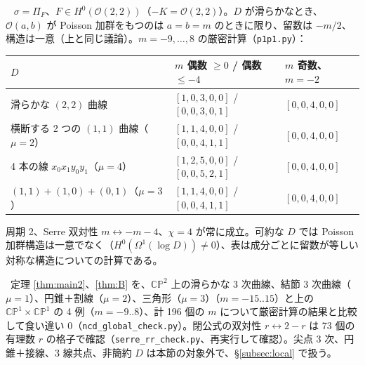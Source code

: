 \begin{ex}\tP\ \tV\label{ex:p1p1}
$\sigma=\Pi_F$、$F\in H^0(\mathcal O(2,2))$（$-K=\mathcal O(2,2)$）。$D$ が滑らかなとき、$\mathcal O(a,b)$ が Poisson 加群をもつのは $a=b=m$ のときに限り、留数は $-m/2$、構造は一意（上と同じ議論）。$m=-9,\dots,8$ の厳密計算（\texttt{p1p1.py}）：
\begin{center}\small
\begin{tabular}{lll}\toprule
$D$ & $m$ 偶数 $\ge0$ / 偶数 $\le-4$ & $m$ 奇数、$m=-2$\\\midrule
滑らかな $(2,2)$ 曲線 & $[1,0,3,0,0]$ / $[0,0,3,0,1]$ & $[0,0,4,0,0]$\\
横断する 2 つの $(1,1)$ 曲線（$\mu=2$） & $[1,1,4,0,0]$ / $[0,0,4,1,1]$ & $[0,0,4,0,0]$\\
4 本の線 $x_0x_1y_0y_1$（$\mu=4$） & $[1,2,5,0,0]$ / $[0,0,5,2,1]$ & $[0,0,4,0,0]$\\
$(1,1)+(1,0)+(0,1)$（$\mu=3$） & $[1,1,4,0,0]$ / $[0,0,4,1,1]$ & $[0,0,4,0,0]$\\\bottomrule
\end{tabular}
\end{center}
周期 2、Serre 双対性 $m\leftrightarrow-m-4$、$\chi=4$ が常に成立。可約な $D$ では Poisson 加群構造は一意でなく（$H^0(\Omega^1(\log D))\ne0$）、表は成分ごとに留数が等しい対称な構造についての計算である。
\end{ex}
\tV\ 定理 \ref{thm:main2}、\ref{thm:B} を、$\mathbb{CP}^2$ 上の滑らかな 3 次曲線、結節 3 次曲線（$\mu=1$）、円錐＋割線（$\mu=2$）、三角形（$\mu=3$）（$m=-15..15$）と上の $\mathbb{CP}^1\times\mathbb{CP}^1$ の 4 例（$m=-9..8$）、計 196 個の $m$ について厳密計算の結果と比較して食い違い 0（\texttt{ncd\_global\_check.py}）。閉公式の双対性 $r\leftrightarrow2-r$ は 73 個の有理数 $r$ の格子で確認（\texttt{serre\_rr\_check.py}、再実行して確認）。尖点 3 次、円錐＋接線、3 線共点、非簡約 $D$ は本節の対象外で、\S\ref{subsec:local} で扱う。

